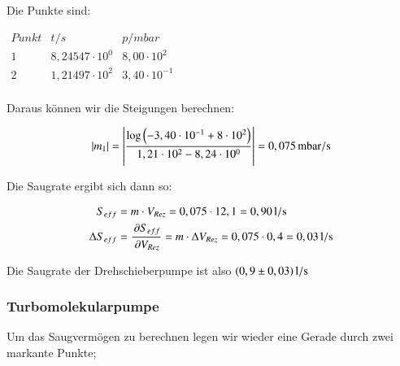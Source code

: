 Die Punkte sind:

\begin{center}
	$
	\begin{matrix}
	Punkt	& t/s & p/mbar \\ 
	1	& 8,24547 \cdot 10^{0} & 8,00 \cdot 10^{2} \\ 
	2	& 1,21497 \cdot 10^{2} & 3,40 \cdot 10^{-1} \\ 

	\end{matrix} 
	$	
\end{center}


Daraus können wir die Steigungen berechnen:

\begin{align*}
|m_1| &= \left| \frac{\log\left(-3,40 \cdot 10^{-1} + 8 \cdot 10^{2}\right)}{1,21 \cdot 10^{2} - 8,24 \cdot 10^{0}} \right| = \unit[0,075]{mbar/s} \\
\end{align*}

Die Saugrate ergibt sich dann so:

\begin{align*}
S_{eff} &= m \cdot V_{Rez} = 0,075 \cdot 12,1 = \unit[0,90]{l/s} \\
\Delta S_{eff} &= \frac{\p S_{eff}}{\p V_{Rez}} = m \cdot \Delta V_{Rez} = 0,075 \cdot 0,4 = \unit[0,03]{l/s}
\end{align*}


Die Saugrate der Drehschieberpumpe ist also $\unit[(0,9 \pm 0,03)]{l/s}$


\subsubsection*{Turbomolekularpumpe}

Um das Saugvermögen zu berechnen legen wir wieder eine Gerade durch zwei markante Punkte;

\begin{figure}[h]
\end{figure}

